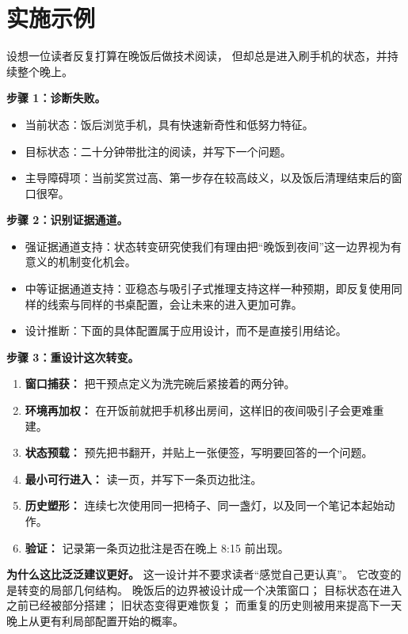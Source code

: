 \section{实施示例}

\begin{example}[把晚饭后的学习重建为一种转变设计]
设想一位读者反复打算在晚饭后做技术阅读，
但却总是进入刷手机的状态，并持续整个晚上。

\textbf{步骤 1：诊断失败。}
\begin{itemize}[nosep]
  \item 当前状态：饭后浏览手机，具有快速新奇性和低努力特征。
  \item 目标状态：二十分钟带批注的阅读，并写下一个问题。
  \item 主导障碍项：当前奖赏过高、第一步存在较高歧义，以及饭后清理结束后的窗口很窄。
\end{itemize}

\textbf{步骤 2：识别证据通道。}
\begin{itemize}[nosep]
  \item 强证据通道支持：状态转变研究使我们有理由把“晚饭到夜间”这一边界视为有意义的机制变化机会。
  \item 中等证据通道支持：亚稳态与吸引子式推理支持这样一种预期，即反复使用同样的线索与同样的书桌配置，会让未来的进入更加可靠。
  \item 设计推断：下面的具体配置属于应用设计，而不是直接引用结论。
\end{itemize}

\textbf{步骤 3：重设计这次转变。}
\begin{enumerate}[nosep]
  \item \textbf{窗口捕获：} 把干预点定义为洗完碗后紧接着的两分钟。
  \item \textbf{环境再加权：} 在开饭前就把手机移出房间，这样旧的夜间吸引子会更难重建。
  \item \textbf{状态预载：} 预先把书翻开，并贴上一张便签，写明要回答的一个问题。
  \item \textbf{最小可行进入：} 读一页，并写下一条页边批注。
  \item \textbf{历史塑形：} 连续七次使用同一把椅子、同一盏灯，以及同一个笔记本起始动作。
  \item \textbf{验证：} 记录第一条页边批注是否在晚上 8:15 前出现。
\end{enumerate}

\textbf{为什么这比泛泛建议更好。}
这一设计并不要求读者“感觉自己更认真”。
它改变的是转变的局部几何结构。
晚饭后的边界被设计成一个决策窗口；
目标状态在进入之前已经被部分搭建；
旧状态变得更难恢复；
而重复的历史则被用来提高下一天晚上从更有利局部配置开始的概率。
\end{example}

